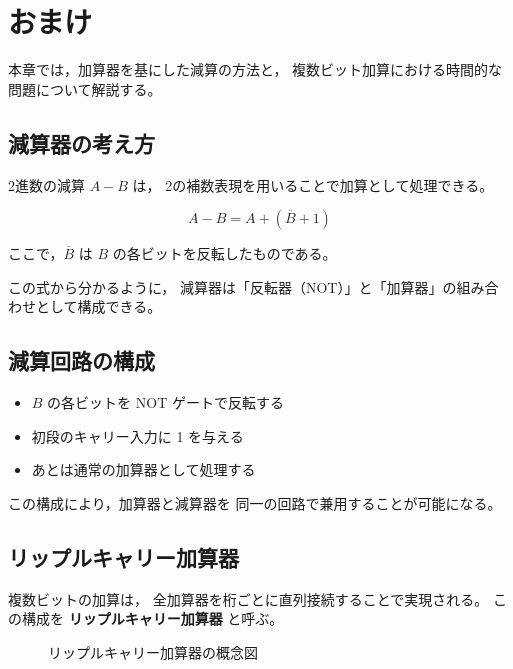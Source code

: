 \section{おまけ}

本章では，加算器を基にした減算の方法と，
複数ビット加算における時間的な問題について解説する。

\subsection{減算器の考え方}

2進数の減算 $A - B$ は，
2の補数表現を用いることで加算として処理できる。

\[
A - B = A + (\overline{B} + 1)
\]

ここで，$\overline{B}$ は $B$ の各ビットを反転したものである。

この式から分かるように，
減算器は「反転器（NOT）」と「加算器」の組み合わせとして構成できる。

\subsection*{減算回路の構成}

\begin{itemize}
  \item $B$ の各ビットを NOT ゲートで反転する
  \item 初段のキャリー入力に 1 を与える
  \item あとは通常の加算器として処理する
\end{itemize}

この構成により，加算器と減算器を
同一の回路で兼用することが可能になる。

\subsection{リップルキャリー加算器}

複数ビットの加算は，
全加算器を桁ごとに直列接続することで実現される。
この構成を \textbf{リップルキャリー加算器} と呼ぶ。

\begin{figure}[h]
\centering
{}
\caption{リップルキャリー加算器の概念図}
\end{figure}

